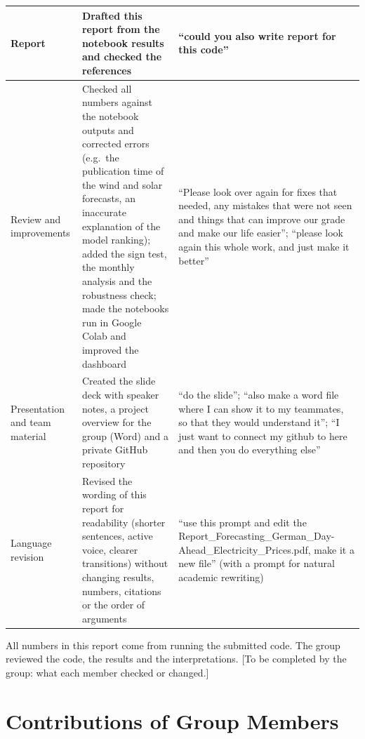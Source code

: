 \documentclass[12pt,oneside]{article}
\begin{document}
{\begin{longtable}{@{}>{\raggedright\arraybackslash}p{}>{\raggedright\arraybackslash}p{}>{\raggedright\arraybackslash}p{}@{}}
        \midrule
        Report & Drafted this report from the notebook results and checked the references & \enquote{could you also write report for this code} \\
        \midrule
        Review and improvements & Checked all numbers against the notebook outputs and corrected errors (e.g.\ the publication time of the wind and solar forecasts, an inaccurate explanation of the model ranking); added the sign test, the monthly analysis and the robustness check; made the notebooks run in Google Colab and improved the dashboard & \enquote{Please look over again for fixes that needed, any mistakes that were not seen and things that can improve our grade and make our life easier}; \enquote{please look again this whole work, and just make it better} \\
        \midrule
        Presentation and team material & Created the slide deck with speaker notes, a project overview for the group (Word) and a private GitHub repository & \enquote{do the slide}; \enquote{also make a word file where I can show it to my teammates, so that they would understand it}; \enquote{I just want to connect my github to here and then you do everything else} \\
        \midrule
        Language revision & Revised the wording of this report for readability (shorter sentences, active voice, clearer transitions) without changing results, numbers, citations or the order of arguments & \enquote{use this prompt and edit the Report\_Forecasting\_German\_Day-Ahead\_Electricity\_Prices.pdf, make it a new file} (with a prompt for natural academic rewriting) \\
\end{longtable}
}

All numbers in this report come from running the submitted code. The group reviewed the code, the results and the interpretations. [To be completed by the group: what each member checked or changed.]

\section{Contributions of Group Members} \label{sec:contrib}
\end{document}
